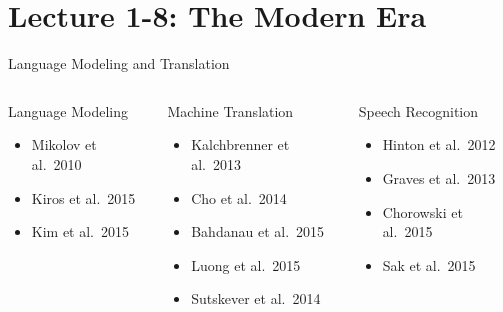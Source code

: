 \documentclass{beamer}
\begin{document}
\section{Lecture 1-8: The Modern Era}

\begin{frame}{Language Modeling and Translation}

\begin{columns}


\begin{block}{Language Modeling}
\begin{itemize}
\item Mikolov et al.\ 2010
\item Kiros et al.\ 2015
\item Kim et al.\ 2015
\end{itemize}
\end{block}

\begin{block}{Machine Translation}
\begin{itemize}
\item Kalchbrenner et al.\ 2013
\item Cho et al.\ 2014
\item Bahdanau et al.\ 2015
\item Luong et al.\ 2015
\item Sutskever et al.\ 2014
\end{itemize}
\end{block}


\begin{block}{Speech Recognition}
\begin{itemize}
\item Hinton et al.\ 2012
\item Graves et al.\ 2013
\item Chorowski et al.\ 2015
\item Sak et al.\ 2015
\end{itemize}
\end{block}

\end{columns}

\end{frame}

\end{document}
